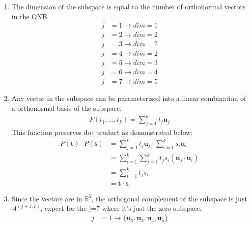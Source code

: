 \documentclass[12pt]{article}
\begin{document}
\begin{enumerate}
\begin{enumerate}
              \item{}
                    The dimension of the subspace is equal to the number of orthonormal vectors in the ONB.
                    \begin{align*}
                        j & =1 \rightarrow{} dim = 1 \\
                        j & =2 \rightarrow{} dim = 2 \\
                        j & =3 \rightarrow{} dim = 2 \\
                        j & =4 \rightarrow{} dim = 2 \\
                        j & =5 \rightarrow{} dim = 3 \\
                        j & =6 \rightarrow{} dim = 4 \\
                        j & =7 \rightarrow{} dim = 5
                    \end{align*}
              \item{}
                    Any vector in the subspace can be parameterized into a linear combination of a orthonormal basis of the subspace.
                    \begin{align*}
                        P (t_1, \dots, t_k) = \sum_{j=1}^{k} t_j\mathbf{u}_j
                    \end{align*}
                    This function preserves dot product as demonstrated below:
                    \begin{align*}
                        P (\mathbf{t}) \cdot{} P (\mathbf{s}) & = \sum_{j=1}^{k} t_j\mathbf{u}_j \cdot{} \sum_{i=1}^{k} s_i\mathbf{u}_i    \\
                                                              & = \sum_{i=1}^{k}\sum_{j=1}^{k} t_js_i (\mathbf{u}_j  \cdot{} \mathbf{u}_i) \\
                                                              & = \sum_{i=1}^{k} t_js_i                                                    \\
                                                              & = \mathbf{t} \cdot{} \mathbf{s}
                    \end{align*}
              \item{}
                    Since the vectors are in $\mathbb{R}^5$, the orthogonal complement of the subspace is just \(A^{(j+1,7)}\), expect for the j=7 where it's just the zero subspace.
                    \begin{align*}
                        j & =1 \rightarrow{} \{\mathbf{u}_2, \mathbf{u}_3, \mathbf{u}_4, \mathbf{u}_5\} \\

\end{align*}
\end{enumerate}
\end{enumerate}
\end{document}
